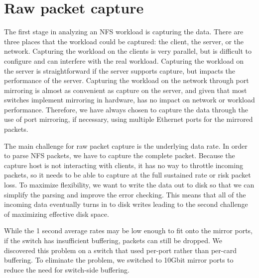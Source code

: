 \section{Raw packet capture}
\label{sec:capture}

The first stage in analyzing an NFS workload is capturing the data.
There are three places that the workload could be captured: the
client, the server, or the network.  Capturing the workload on the
clients is very parallel, but is difficult to configure and can
interfere with the real workload.  Capturing the workload on the
server is straightforward if the server supports capture, 
but impacts the performance of the
server.  Capturing the workload on the network through port mirroring
is almost as convenient as capture on the server, and given that most
switches implement mirroring in hardware, has no impact on network or
workload performance.  
Therefore, we have always chosen to capture the data through the use
of port mirroring, if necessary, using multiple Ethernet ports for the
mirrored packets.

The main challenge for raw packet capture is the underlying data rate.
In order to parse NFS packets, we have to capture the complete packet.
Because the capture host is not interacting with clients, it has no
way to throttle incoming packets, so it needs to be able to capture at
the full sustained rate or risk packet loss.  To maximize flexibility,
we want to write the data out to disk so that we can simplify the
parsing and improve the error checking.  This means that all of the
incoming data eventually turns in to disk writes leading to the second
challenge of maximizing effective disk space.


While the 1 second average rates may be low enough to fit onto the mirror
ports, if the switch has insufficient buffering, packets can still be
dropped. We discovered this problem on a switch that used per-port
rather than per-card buffering.  To eliminate the problem, we switched
to 10Gbit mirror ports to reduce the need for switch-side buffering.

